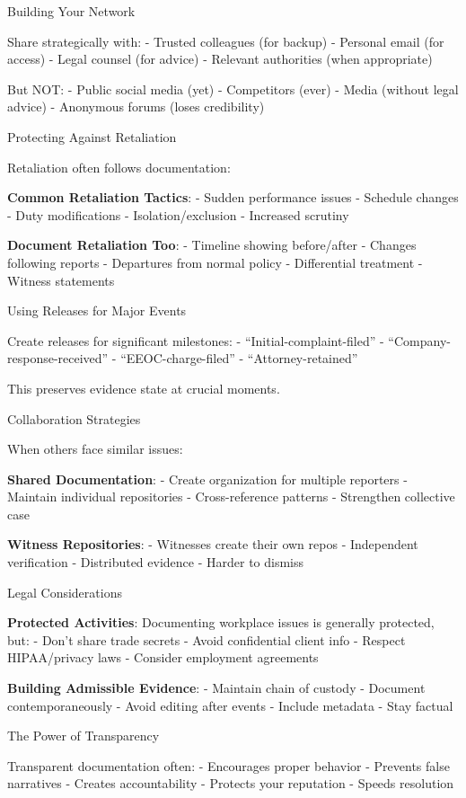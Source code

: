 Building Your Network

Share strategically with: - Trusted colleagues (for backup) - Personal
email (for access) - Legal counsel (for advice) - Relevant authorities
(when appropriate)

But NOT: - Public social media (yet) - Competitors (ever) - Media
(without legal advice) - Anonymous forums (loses credibility)

Protecting Against Retaliation

Retaliation often follows documentation:

\textbf{Common Retaliation Tactics}: - Sudden performance issues -
Schedule changes - Duty modifications - Isolation/exclusion - Increased
scrutiny

\textbf{Document Retaliation Too}: - Timeline showing before/after -
Changes following reports - Departures from normal policy - Differential
treatment - Witness statements

Using Releases for Major Events

Create releases for significant milestones: -
``Initial-complaint-filed'' - ``Company-response-received'' -
``EEOC-charge-filed'' - ``Attorney-retained''

This preserves evidence state at crucial moments.

Collaboration Strategies

When others face similar issues:

\textbf{Shared Documentation}: - Create organization for multiple
reporters - Maintain individual repositories - Cross-reference patterns
- Strengthen collective case

\textbf{Witness Repositories}: - Witnesses create their own repos -
Independent verification - Distributed evidence - Harder to dismiss

Legal Considerations

\textbf{Protected Activities}: Documenting workplace issues is generally
protected, but: - Don't share trade secrets - Avoid confidential client
info - Respect HIPAA/privacy laws - Consider employment agreements

\textbf{Building Admissible Evidence}: - Maintain chain of custody -
Document contemporaneously - Avoid editing after events - Include
metadata - Stay factual

The Power of Transparency

Transparent documentation often: - Encourages proper behavior - Prevents
false narratives - Creates accountability - Protects your reputation -
Speeds resolution

